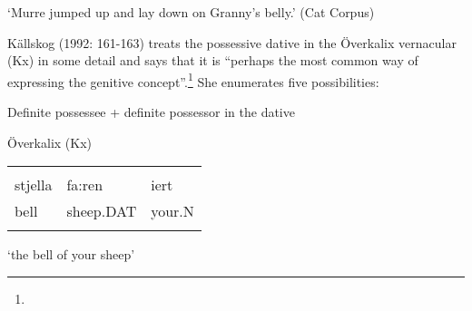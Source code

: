 \begin{styleTranslation}
‘Murre jumped up and lay down on Granny’s belly.’ (Cat Corpus)

\end{styleTranslation}

\begin{styleBodyTextFirst}
Källskog (1992: 161-163) treats the possessive dative in the Överkalix vernacular (Kx) in some detail and says that it is “perhaps the most common way of expressing the genitive concept”.\footnote{} She enumerates five possibilities:

\end{styleBodyTextFirst}


\begin{listWWNumxiileveli}
\item 

\begin{styleListii}
Definite possessee + definite possessor in the dative

\end{styleListii}

\end{listWWNumxiileveli}

\begin{listWWNumileveli}
\item 

\begin{styleExample}
Överkalix (Kx)

\end{styleExample}

\end{listWWNumileveli}

\begin{listWWNumxcileveli}
\item 

\end{listWWNumxcileveli}

\begin{tabular}{lll}
\lsptoprule
\multicolumn{3}{l}{{\bfseries\scshape possessee}

}\\
stjella & fa:ren & iert\\
bell & sheep.DAT & your.N\\
\lspbottomrule
\end{tabular}

\begin{styleTranslation}
‘the bell of your sheep’

\end{styleTranslation}

